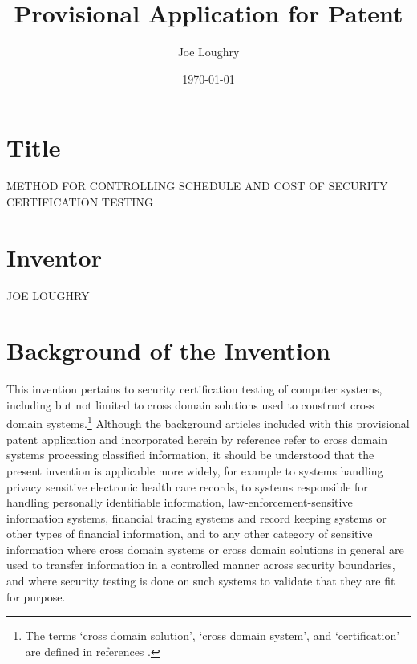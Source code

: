 \documentclass[12pt,letterpaper]{article}
\title{Provisional Application for Patent}
\author{Joe Loughry}
\date{\today}
\begin{document}
\maketitle

\section{Title} METHOD FOR CONTROLLING SCHEDULE AND COST OF SECURITY CERTIFICATION TESTING

\section{Inventor} JOE LOUGHRY

\section{Background of the Invention}

This invention pertains to security certification testing of computer systems, including but
not limited to cross domain solutions used to construct cross domain systems.\footnote{The
terms `cross domain solution', `cross domain system', and `certification' are defined in
references \cite{Loughry2010a,Loughry2012a,Loughry2012b}.}  Although the background articles
included with this
provisional patent application and incorporated herein by reference refer to cross domain
systems processing classified information, it should be understood that the present
invention is applicable more widely, for example to systems handling privacy sensitive electronic
health care records,
to systems responsible for handling personally identifiable information, law-enforcement-sensitive
information systems, financial trading systems and record keeping systems or other types of
financial information, and to any other category of sensitive information where cross domain
systems or cross domain solutions in general are used to transfer information in a controlled manner
across security boundaries, and where security testing is done on such
systems to validate that they are fit for purpose.
\end{document}
